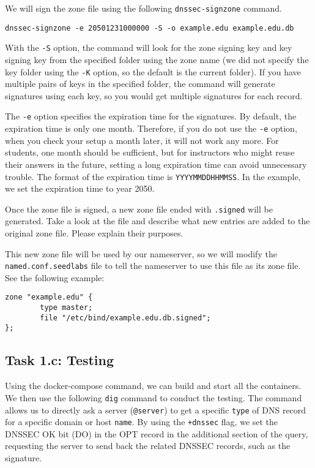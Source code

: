 We will sign the zone file using the following \texttt{dnssec-signzone} command. 


\begin{lstlisting}
dnssec-signzone -e 20501231000000 -S -o example.edu example.edu.db
\end{lstlisting}
 
With the \texttt{-S} option, the command will look
for the zone signing key and key signing key 
from the specified folder using the zone name (we did not specify the key folder 
using the \texttt{-K} option, so the default is the current folder).
If you have multiple pairs of keys in the specified folder,
the command will generate signatures using each key, so you would get 
multiple signatures for each record. 

The \texttt{-e} option specifies the expiration time for the 
signatures. By default, the expiration time is only one month. Therefore,
if you do not use the \texttt{-e} option, when you check your setup
a month later, it will not work any more. For students, one month 
should be sufficient, but for instructors who might reuse their answers in
the future, setting a long expiration time can avoid unnecessary trouble. 
The format of the expiration time is \texttt{YYYYMMDDHHMMSS}. In the example, we 
set the expiration time to year 2050. 


Once the zone file is signed, a new zone file ended with
\texttt{.signed} will be generated. Take a look at the file and describe 
what new entries are added to the original zone file. Please explain
their purposes. 


This new zone file will be used by our nameserver, so 
we will modify the \texttt{named.conf.seedlabs} file to tell the 
nameserver to use this file as its zone file. See the following 
example: 

\begin{lstlisting}
zone "example.edu" {
        type master;
        file "/etc/bind/example.edu.db.signed";
};
\end{lstlisting}


\subsection{Task 1.c: Testing}

Using the docker-compose command, we can build and start all the 
containers. We then use the following \texttt{dig} command to conduct the testing. 
The command allows us to directly ask 
a server (\texttt{@server}) to get a specific \texttt{type}
of DNS record for a specific domain or host \texttt{name}.
By using the \texttt{+dnssec} flag, we set the DNSSEC OK bit (DO) in the OPT record 
in the additional section of the query, requesting the server to
send back the related DNSSEC records, such as the signature. 

